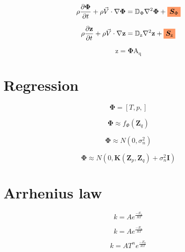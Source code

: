 \documentclass[20pt,twocolumn]{article}
\newcommand{\highlight}[1]{%
  \colorbox{pink-orange}{$\displaystyle#1$}}
\begin{document}
\begin{equation*}
\rho \frac{\partial \bm{\Phi}}{\partial t} + \rho \vec{V} \cdot \nabla \bm{\Phi} = \mathbb{D}_{\Phi} \nabla^2 \bm{\Phi} + \highlight{\bm{S}_{\Phi}}
\end{equation*}

\begin{equation*}
\rho \frac{\partial \bm{\mathrm{z}}}{\partial t} + \rho \vec{V} \cdot \nabla \bm{\mathrm{z}} = \mathbb{D}_{\mathrm{z}} \nabla^2 \bm{\mathrm{z}} + \highlight{\bm{S}_{\mathrm{z}}}
\end{equation*}


\begin{equation*}
\bm{\mathrm{z}} = \bm{\Phi} \bm{\mathrm{A_q}}
\end{equation*}








\section{Regression}

\begin{equation*}
\bm{\Phi} = [T, p, ]
\end{equation*}

\begin{equation*}
\bm{\Phi} \approx f_{\Phi} (\bm{Z}_q)
\end{equation*}

\begin{equation*}
\bm{\Phi} \approx N (0, \sigma_{n}^2)
\end{equation*}

\begin{equation*}
\bm{\Phi} \approx N (0, \bm{K}(\bm{Z}_p, \bm{Z}_q) + \sigma_{n}^2 \bm{I})
\end{equation*}

\section{Arrhenius law}

\begin{equation*}
k = A e^{\frac{-E_a}{R T}}
\end{equation*}

\begin{equation*}
k = A e^{\frac{-E_a}{R T}}
\end{equation*}

\begin{equation*}
k = A T^n e^{\frac{-E_a}{R T}}
\end{equation*}
\end{document}
